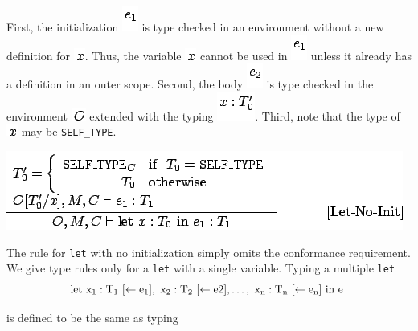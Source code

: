 \documentclass[]{article}
\begin{document}
First, the initialization \includegraphics{img76.png} is type checked in
an environment without a new definition for \includegraphics{img91.png}.
Thus, the variable \includegraphics{img91.png} cannot be used in
\includegraphics{img76.png} unless it already has a definition in an
outer scope. Second, the body \includegraphics{img92.png} is type
checked in the environment \includegraphics{img56.png} extended with the
typing \includegraphics{img93.png}. Third, note that the type of
\includegraphics{img91.png} may be \texttt{SELF\_TYPE}.

\includegraphics{img94.png}

The rule for \texttt{let} with no initialization simply omits the
conformance requirement. We give type rules only for a \texttt{let} with
a single variable. Typing a multiple \texttt{let} \\

\begin{displaymath}\rm let\ x_1 : T_1\ [\leftarrow e_1],\ x_2: T_2\ [\leftarrow e2], \ldots,\ x_n :T_n\ [\leftarrow e_n]\ in\ e\ \end{displaymath}

is defined to be the same as typing \\
\end{document}
